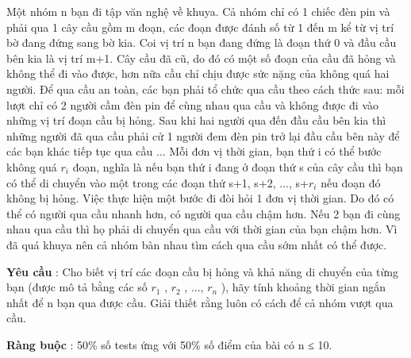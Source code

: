 Một nhóm n bạn đi tập văn nghệ về khuya. Cả nhóm chỉ có 1 chiếc đèn pin và phải qua 1 cây cầu gồm m đoạn, các đoạn được đánh số từ 1 đến m kể từ vị trí bờ đang đứng sang bờ kia. Coi vị trí n bạn đang đứng là đoạn thứ 0 và đầu cầu bên kia là vị trí m+1. Cây cầu đã cũ, do đó có một số đoạn của cầu đã hỏng và không thể đi vào được, hơn nữa cầu chỉ chịu được sức nặng của không quá hai người. Để qua cầu an toàn, các bạn phải tổ chức qua cầu theo cách thức sau: mỗi lượt chỉ có 2 người cầm đèn pin để cùng nhau qua cầu và không được đi vào những vị trí đoạn cầu bị hỏng. Sau khi hai người qua đến đầu cầu bên kia thì những người đã qua cầu phải cử 1 người đem đèn pin trở lại đầu cầu bên này để các bạn khác tiếp tục qua cầu ... Mỗi đơn vị thời gian, bạn thứ i có thể bước không quá $r_{i}$ đoạn, nghĩa là nếu bạn thứ i đang ở đoạn thứ s của cây cầu thì bạn có thể di chuyển vào một trong các đoạn thứ s+1, s+2, ..., s+$r_{i}$ nếu đoạn đó không bị hỏng. Việc thực hiện một bước đi đòi hỏi 1 đơn vị thời gian. Do đó có thể có người qua cầu nhanh hơn, có người qua cầu chậm hơn. Nếu 2 bạn đi cùng nhau qua cầu thì họ phải di chuyển qua cầu với thời gian của bạn chậm hơn. Vì đã quá khuya nên cả nhóm bàn nhau tìm cách qua cầu sớm nhất có thể được.

\textbf{Yêu cầu } : Cho biết vị trí các đoạn cầu bị hỏng và khả năng di chuyển của từng bạn (được mô tả bằng các số $r_{1}$ , $r_{2}$ , ..., $r_{n}$ ), hãy tính khoảng thời gian ngắn nhất để n bạn qua được cầu. Giải thiết rằng luôn có cách để cả nhóm vượt qua cầu.

\textbf{Ràng buộc } : 50\% số tests ứng với 50\% số điểm của bài có n ≤ 10.
